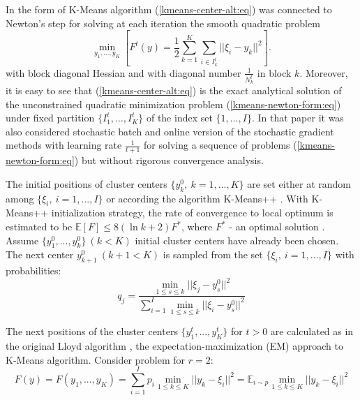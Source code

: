 In \cite{Bottou_1994} the form of K-Means algorithm (\ref{kmeans-center-alt:eq}) was connected to Newton's step for solving at each iteration the smooth quadratic problem
\begin{equation}
    \label{kmeans-newton-form:eq}
        \min_{y_1,\ldots,y_K}\left[F^t(y) = \frac{1}{2} \sum_{k=1}^K \sum_{i \in I_k^t} || \xi_i - y_k ||^2\right].
\end{equation}
\noindent with block diagonal Hessian and with diagonal number $ \frac{1}{N_k^t} $ in block $ k $. Moreover, it is easy to see that (\ref{kmeans-center-alt:eq}) is the exact analytical solution of the unconstrained quadratic minimization problem (\ref{kmeans-newton-form:eq}) under fixed partition $\{I_1^t,\ldots,I_K^t\}$ of the index set $\{1,\ldots,I\}$. In that paper it was also considered stochastic batch and online version of the stochastic gradient methods with learning rate $ \frac{1}{t + 1} $ for solving a sequence of problems (\ref{kmeans-newton-form:eq}) but without rigorous convergence analysis.

The initial positions of cluster centers $ \{ y_k^0, \> k = 1, ..., K \} $ are set either at random among $ \{ \xi_i, \> i = 1, ..., I \} $ or according the algorithm K-Means++ \cite{Arthur_Vassilvitskii_2007,Nguyen_Duong_2018}. With K-Means++ initialization strategy, the rate of convergence to local optimum is estimated to be $ \mathbb{E} [F] \leq 8(\ln k + 2 ) F^{*} $, where $ F^{*} $ - an optimal solution \cite{Arthur_Vassilvitskii_2007}. Assume $ \{ y_1^0, ..., y_k^0 \} \> (k<K) $ initial cluster centers have already been chosen. The next center $ y_{k+1}^0 \> (k+1<K) $ is sampled from the set $ \{ \xi_i, \> i = 1, ..., I \} $ with probabilities:
\begin{equation}
    \label{kmeans-plus-plus-init:eq}
        q_j = \frac{\min_{1 \leq s \leq k} || \xi_j - y_s^0 ||^2}{\sum_{i=1}^I \min_{1 \leq s \leq k} || \xi_i - y_s^0 ||^2}
\end{equation}

The next positions of the cluster centers $ \{ y_1^t, ..., y_K^t \} $ for $ t > 0 $ are calculated as in the original Lloyd algorithm \cite{Lloyd_1982}, the expectation-maximization (EM) approach to K-Means algorithm. Consider problem for $ r = 2 $: 
\begin{equation}
    \label{lloyd-update-step:eq}
        F(y) = F(y_1, ..., y_K) = \sum_{i=1}^I p_i \min_{1 \leq k \leq K} || y_k - \xi_i ||^2 = \mathbb{E}_{i \sim p} \min_{1 \leq k \leq K} || y_k - \xi_i ||^2
\end{equation}

